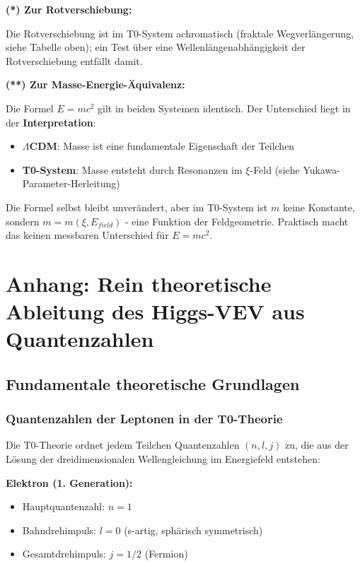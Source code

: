 \textbf{(*) Zur Rotverschiebung:}

Die Rotverschiebung ist im T0-System achromatisch (fraktale Wegverlängerung, siehe Tabelle oben); ein Test über eine Wellenlängenabhängigkeit der Rotverschiebung entfällt damit.

\textbf{(**) Zur Masse-Energie-Äquivalenz:}

Die Formel $E = mc^2$ gilt in beiden Systemen identisch. Der Unterschied liegt in der \textbf{Interpretation}:

\begin{itemize}
	\item \textbf{$\Lambda$CDM}: Masse ist eine fundamentale Eigenschaft der Teilchen
	\item \textbf{T0-System}: Masse entsteht durch Resonanzen im $\xi$-Feld (siehe Yukawa-Parameter-Herleitung)
\end{itemize}

Die Formel selbst bleibt unverändert, aber im T0-System ist $m$ keine Konstante, sondern $m = m(\xi, E_{field})$ - eine Funktion der Feldgeometrie. Praktisch macht das keinen messbaren Unterschied für $E = mc^2$.
\appendix

\section{Anhang: Rein theoretische Ableitung des Higgs-VEV aus Quantenzahlen}

\subsection{Fundamentale theoretische Grundlagen}

\subsubsection{Quantenzahlen der Leptonen in der T0-Theorie}

Die T0-Theorie ordnet jedem Teilchen Quantenzahlen $(n, l, j)$ zu, die aus der Lösung der dreidimensionalen Wellengleichung im Energiefeld entstehen:

\textbf{Elektron (1. Generation):}
\begin{itemize}
	\item Hauptquantenzahl: $n = 1$
	\item Bahndrehimpuls: $l = 0$ (s-artig, sphärisch symmetrisch)
	\item Gesamtdrehimpuls: $j = 1/2$ (Fermion)
\end{itemize}

